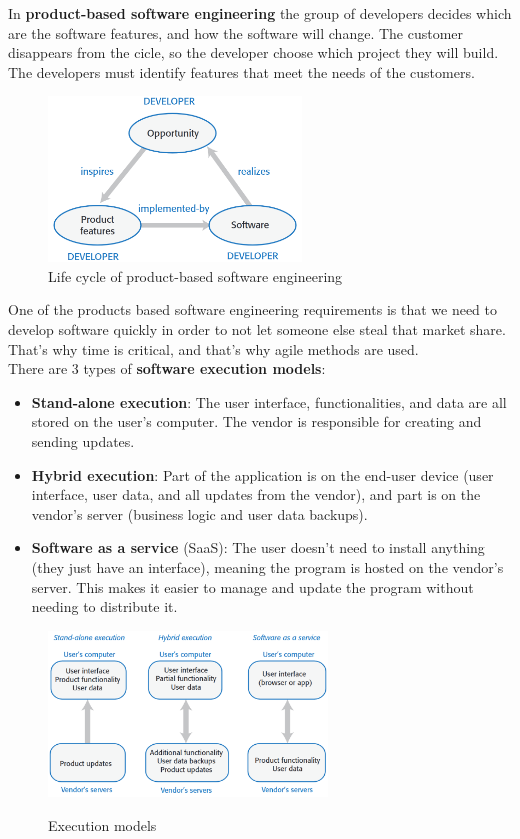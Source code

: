 In \textbf{product-based software engineering} the group of developers decides which are the software features, and how the software will change. The customer disappears from the cicle, so the developer choose which project they will build. The developers must identify features that meet the needs of the customers.

\begin{figure} [H]
    \centering
    \includegraphics[width=0.6\textwidth]{images/Products/productbasedSE.png}
    \caption{Life cycle of product-based software engineering}
    \label{fig:productbasedSE}
\end{figure} 

One of the products based software engineering requirements is that we need to develop software quickly in order to not let someone else steal that market share. That's why time is critical, and that's why agile methods are used. \\

There are 3 types of \textbf{software execution models}: 
\begin{itemize}
    \item \textbf{Stand-alone execution}: The user interface, functionalities, and data are all stored on the user's computer. The vendor is responsible for creating and sending updates.
    \item \textbf{Hybrid execution}: Part of the application is on the end-user device (user interface, user data, and all updates from the vendor), and part is on the vendor's server (business logic and user data backups).
    \item \textbf{Software as a service} (SaaS): The user doesn't need to install anything (they just have an interface), meaning the program is hosted on the vendor's server. This makes it easier to manage and update the program without needing to distribute it. 
\end{itemize}

\begin{figure} [H]
    \centering
    \includegraphics[width=0.66\textwidth]{images/Products/executionmodels.png}
    \label{fig:executionmodels}
    \caption{Execution models}
\end{figure} 

